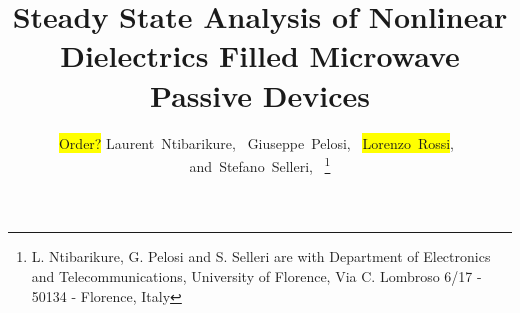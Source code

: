 \documentclass[journal]{IEEEtran}
\newcommand{\hilight}[1]{\colorbox{yellow}{#1}}
\begin{document}

%
\title{Steady State Analysis of Nonlinear Dielectrics Filled Microwave Passive Devices}
%
%
%

\author{ \hilight{Order?} Laurent~Ntibarikure,~
		Giuseppe~Pelosi,~
		\hilight{ Lorenzo~Rossi},~%
        and~Stefano~Selleri,~%
		\thanks{ L. Ntibarikure, G. Pelosi and S. Selleri are with
		Department of Electronics and Telecommunications,
		University of Florence, Via C. Lombroso 6/17 - 50134 - Florence, Italy } }%

% 
%
\end{document}
